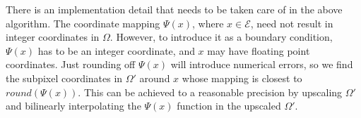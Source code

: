 \documentclass[lettersize,journal]{IEEEtran}
\begin{document}
There is an implementation detail that needs to be taken care of in the above algorithm. The coordinate mapping $\Psi(x)$, where $x\in \mathcal{E} $, need not result in integer coordinates in $\Omega$. However, to introduce it as a boundary condition, $\Psi(x)$ has to be an integer coordinate, and $x$ may have floating point coordinates. Just rounding off $\Psi(x)$ will introduce numerical errors, so we find the subpixel coordinates in $\Omega'$ around $x$ whose mapping is closest to $round(\Psi(x))$. This can be achieved to a reasonable precision by upscaling $\Omega'$ and bilinearly interpolating the $\Psi(x)$ function in the upscaled $\Omega'$.

\end{document}

